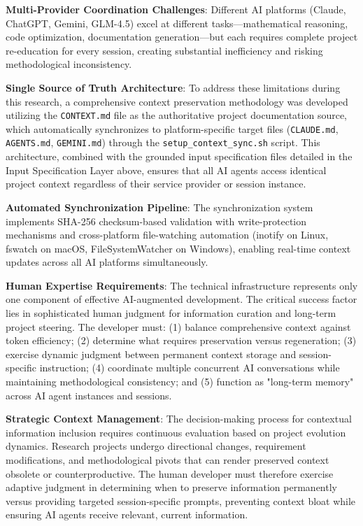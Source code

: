 \textbf{Multi-Provider Coordination Challenges}: Different AI platforms (Claude, ChatGPT, Gemini, GLM-4.5) excel at different tasks—mathematical reasoning, code optimization, documentation generation—but each requires complete project re-education for every session, creating substantial inefficiency and risking methodological inconsistency.

\textbf{Single Source of Truth Architecture}: To address these limitations during this research, a comprehensive context preservation methodology was developed utilizing the \texttt{CONTEXT.md} file as the authoritative project documentation source, which automatically synchronizes to platform-specific target files (\texttt{CLAUDE.md}, \texttt{AGENTS.md}, \texttt{GEMINI.md}) through the \texttt{setup\_context\_sync.sh} script. This architecture, combined with the grounded input specification files detailed in the Input Specification Layer above, ensures that all AI agents access identical project context regardless of their service provider or session instance.

\textbf{Automated Synchronization Pipeline}: The synchronization system implements SHA-256 checksum-based validation with write-protection mechanisms and cross-platform file-watching automation (inotify on Linux, fswatch on macOS, FileSystemWatcher on Windows), enabling real-time context updates across all AI platforms simultaneously.

\textbf{Human Expertise Requirements}: The technical infrastructure represents only one component of effective AI-augmented development. The critical success factor lies in sophisticated human judgment for information curation and long-term project steering. The developer must: (1) balance comprehensive context against token efficiency; (2) determine what requires preservation versus regeneration; (3) exercise dynamic judgment between permanent context storage and session-specific instruction; (4) coordinate multiple concurrent AI conversations while maintaining methodological consistency; and (5) function as "long-term memory" across AI agent instances and sessions.

\textbf{Strategic Context Management}: The decision-making process for contextual information inclusion requires continuous evaluation based on project evolution dynamics. Research projects undergo directional changes, requirement modifications, and methodological pivots that can render preserved context obsolete or counterproductive. The human developer must therefore exercise adaptive judgment in determining when to preserve information permanently versus providing targeted session-specific prompts, preventing context bloat while ensuring AI agents receive relevant, current information.

